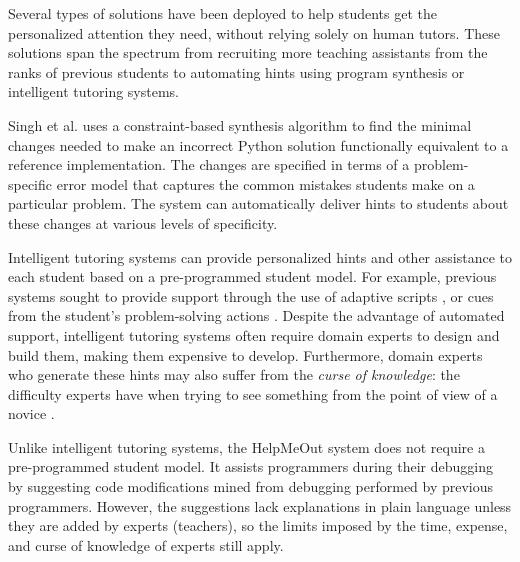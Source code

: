 Several types of solutions have been deployed to help students get the personalized attention they need, without relying solely on human tutors. These solutions span the spectrum from recruiting more teaching assistants from the ranks of previous students \cite{communityTAs} to automating hints using program synthesis or intelligent tutoring systems. 

Singh et al. \cite{rishabh} uses a constraint-based synthesis algorithm to find the minimal changes needed to make an incorrect Python solution functionally equivalent to a reference implementation. The changes are specified in terms of a problem-specific error model that captures the common mistakes students make on a particular problem. The system can automatically deliver hints to students about these changes at various levels of specificity. 

Intelligent tutoring systems can provide personalized hints and other assistance to each student based on a pre-programmed student model. For example, previous systems sought to provide support through the use of adaptive scripts \cite{kumar2007tutorial}, or cues from the student's problem-solving actions \cite{diziol}. Despite the advantage of automated support, intelligent tutoring systems often require domain experts to design and build them, making them expensive to develop.  Furthermore, domain experts who generate these hints may also suffer from the {\it curse of knowledge}: the difficulty experts have when trying to see something from the point of view of a novice \cite{curse}. 

Unlike intelligent tutoring systems, the HelpMeOut system \cite{helpmeout} does not require a pre-programmed student model. It assists programmers during their debugging by suggesting code modifications mined from debugging performed by previous programmers. However, the suggestions lack explanations in plain language unless they are added by experts (teachers), so the limits imposed by the time, expense, and curse of knowledge of experts still apply.

